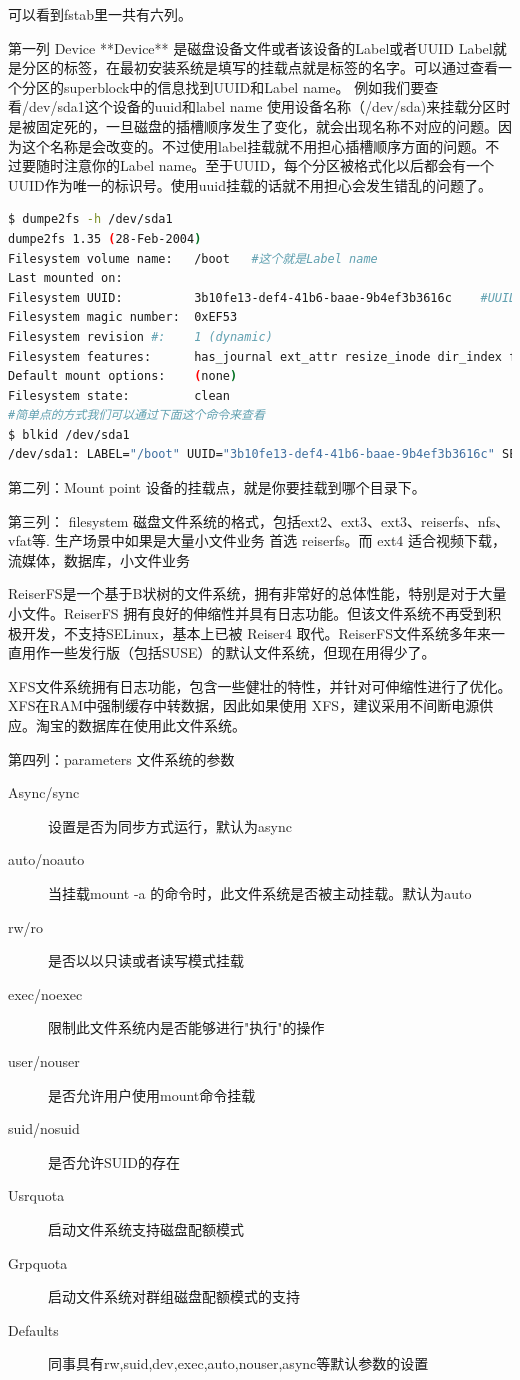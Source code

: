 可以看到fstab里一共有六列。

第一列 Device **Device**  是磁盘设备文件或者该设备的Label或者UUID
Label就是分区的标签，在最初安装系统是填写的挂载点就是标签的名字。可以通过查看一个分区的superblock中的信息找到UUID和Label name。
例如我们要查看/dev/sda1这个设备的uuid和label name
使用设备名称（/dev/sda)来挂载分区时是被固定死的，一旦磁盘的插槽顺序发生了变化，就会出现名称不对应的问题。因为这个名称是会改变的。不过使用label挂载就不用担心插槽顺序方面的问题。不过要随时注意你的Label name。至于UUID，每个分区被格式化以后都会有一个UUID作为唯一的标识号。使用uuid挂载的话就不用担心会发生错乱的问题了。

\begin{lstlisting}[language=bash]
$ dumpe2fs -h /dev/sda1
dumpe2fs 1.35 (28-Feb-2004)
Filesystem volume name:   /boot   #这个就是Label name
Last mounted on:
Filesystem UUID:          3b10fe13-def4-41b6-baae-9b4ef3b3616c    #UUID
Filesystem magic number:  0xEF53
Filesystem revision #:    1 (dynamic)
Filesystem features:      has_journal ext_attr resize_inode dir_index filetype needs_recovery sparse_super
Default mount options:    (none)
Filesystem state:         clean
#简单点的方式我们可以通过下面这个命令来查看
$ blkid /dev/sda1
/dev/sda1: LABEL="/boot" UUID="3b10fe13-def4-41b6-baae-9b4ef3b3616c" SEC_TYPE="ext3" TYPE="ext2"
\end{lstlisting}


第二列：Mount point 设备的挂载点，就是你要挂载到哪个目录下。

第三列： filesystem 磁盘文件系统的格式，包括ext2、ext3、ext3、reiserfs、nfs、vfat等. 生产场景中如果是大量小文件业务 首选 reiserfs。而 ext4 适合视频下载，流媒体，数据库，小文件业务

 ReiserFS是一个基于B状树的文件系统，拥有非常好的总体性能，特别是对于大量小文件。ReiserFS 拥有良好的伸缩性并具有日志功能。但该文件系统不再受到积极开发，不支持SELinux，基本上已被 Reiser4 取代。ReiserFS文件系统多年来一直用作一些发行版（包括SUSE）的默认文件系统，但现在用得少了。

 XFS文件系统拥有日志功能，包含一些健壮的特性，并针对可伸缩性进行了优化。XFS在RAM中强制缓存中转数据，因此如果使用 XFS，建议采用不间断电源供应。淘宝的数据库在使用此文件系统。

第四列：parameters 文件系统的参数

\begin{description}
	\item[Async/sync]设置是否为同步方式运行，默认为async
	\item[auto/noauto]当挂载mount -a 的命令时，此文件系统是否被主动挂载。默认为auto
	\item[rw/ro      ]是否以以只读或者读写模式挂载
	\item[exec/noexec]限制此文件系统内是否能够进行"执行"的操作
	\item[user/nouser]是否允许用户使用mount命令挂载
	\item[suid/nosuid]是否允许SUID的存在
	\item[Usrquota	]启动文件系统支持磁盘配额模式
	\item[Grpquota	]启动文件系统对群组磁盘配额模式的支持
	\item[Defaults	]同事具有rw,suid,dev,exec,auto,nouser,async等默认参数的设置
\end{description}

